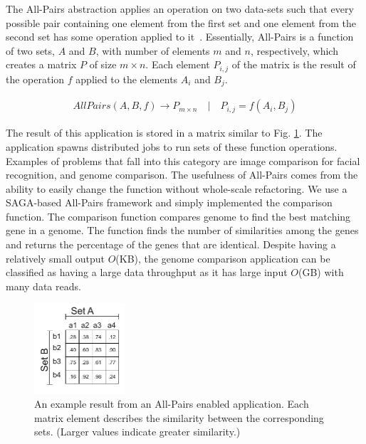 \documentclass{rspublic}
\begin{document}
The All-Pairs abstraction applies an operation on two data-sets such
that every possible pair containing one element from the first set and
one element from the second set has some operation applied to
it~\citep{AllPairs}. Essentially, All-Pairs is a function of two sets,
$A$ and $B$, with number of elements $m$ and $n$, respectively, which
creates a matrix $P$ of size $m \times n$. Each element $P_{i,j}$ of the matrix
is the result of the
operation $f$ applied to the elements $A_i$ and $B_j$.

\vspace{-0.2cm}

\begin{eqnarray}
 AllPairs(A, B, f) \rightarrow P_{m \times n} \quad | \quad P_{i,j} = f(A_{i},B_{j})
 \end{eqnarray}

The result of this application is stored in a matrix similar to Fig.
\ref{Fig:AllPairsExplanation}. The application spawns distributed jobs
to run sets of these function operations. Examples of problems that fall
into this category are image comparison for facial recognition, and
genome comparison. The usefulness of All-Pairs comes from the ability
to easily change the function without whole-scale refactoring.  We use a
SAGA-based All-Pairs framework and simply implemented the comparison
function. The comparison function compares genome to find the best
matching gene in a genome. The function finds the number of similarities
among the genes and returns the percentage of the genes that are
identical. Despite having a relatively small output $O$(KB), the genome
comparison application can be classified as having a large data
throughput as it has large input $O$(GB) with many data reads.

\begin{figure}[!ht]
 \begin{center}
     \includegraphics[width=0.3\textwidth]{data/allpairs-exp.pdf}
\end{center}
\caption{\small An example result from an All-Pairs enabled application.
Each matrix element describes the similarity between the corresponding
sets. (Larger values indicate greater similarity.)}
 \label{Fig:AllPairsExplanation}
\end{figure}
\end{document}
